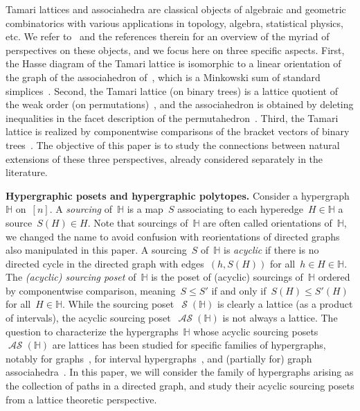 \documentclass{amsart}
\theoremstyle{definition}
\newcommand{\para}[1]{\bigskip\noindent\textbf{#1}} %
\newcommand{\darkblue}{\color{darkblue}} %
\newcommand{\defn}[1]{\textsl{\darkblue #1}} %
\DeclareMathOperator{\Sour}{\mathcal{S}}  %
\DeclareMathOperator{\ASour}{\mathcal{AS}}  %
\newcommand{\HH}{\mathbb H}  %
\begin{document}
Tamari lattices and associahedra are classical objects of algebraic and geometric combinatorics with various applications in topology, algebra, statistical physics, etc.
We refer to~\cite{TamariFestschrift, CeballosSantosZiegler, PilaudSantosZiegler} and the references therein for an overview of the myriad of  perspectives on these objects, and we focus here on three specific aspects.
First, the Hasse diagram of the Tamari lattice is isomorphic to a linear orientation of the graph of the associahedron of~\cite{ShniderSternberg, Loday}, which is a Minkowski sum of standard simplices~\cite{Postnikov}. 
Second, the Tamari lattice (on binary trees) is a lattice quotient of the weak order (on permutations)~\cite{Tonks, Reading-latticeCongruences}, and the associahedron is obtained by deleting inequalities in the facet description of the permutahedron~\cite{ShniderSternberg, Loday}.
Third, the Tamari lattice is realized by componentwise comparisons of the bracket vectors of binary trees~\cite{HuangTamari}.
The objective of this paper is to study the connections between natural extensions of these three perspectives, already considered separately in the literature.


\para{Hypergraphic posets and hypergraphic polytopes.}
Consider a hypergraph~$\HH$ on~$[n]$.
A \defn{sourcing} of~$\HH$ is a map~$S$ associating to each hyperedge~$H \in \HH$ a source~$S(H) \in H$.
Note that sourcings of~$\HH$ are often called orientations of~$\HH$, we changed the name to avoid confusion with reorientations of directed graphs also manipulated in this paper.
A sourcing~$S$ of~$\HH$ is \defn{acyclic} if there is no directed cycle in the directed graph with edges~$(h,S(H))$ for all~$h \in H \in \HH$.
The \defn{(acyclic) sourcing poset} of~$\HH$ is the poset of (acyclic) sourcings of~$\HH$ ordered by componentwise comparison, meaning~$S \le S'$ if and only if~$S(H) \le S'(H)$ for all~$H \in \HH$.
While the sourcing poset~$\Sour(\HH)$ is clearly a lattice (as a product of intervals), the acyclic sourcing poset~$\ASour(\HH)$ is not always a lattice.
The question to characterize the hypergraphs~$\HH$ whose acyclic sourcing posets~$\ASour(\HH)$ are lattices has been studied for specific families of hypergraphs, notably for graphs~\cite{Pilaud-acyclicReorientationLattices}, for interval hypergraphs~\cite{BergeronPilaud}, and (partially for) graph associahedra~\cite{BarnardMcConville}.
In this paper, we will consider the family of hypergraphs arising as the collection of paths in a directed graph, and study their acyclic sourcing posets from a lattice theoretic perspective.
\end{document}
